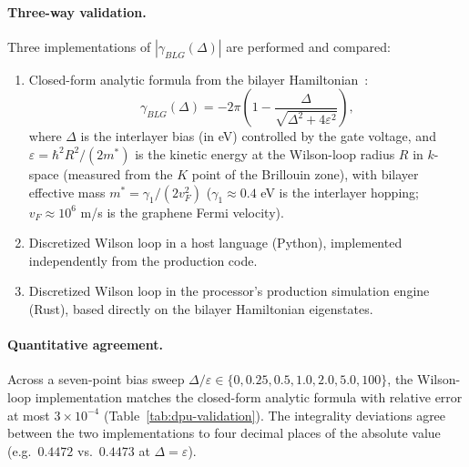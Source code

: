 \documentclass[11pt,letterpaper]{article}
\begin{document}
\paragraph{Three-way validation.}
Three implementations of $|\gamma_{BLG}(\Delta)|$ are
performed and compared:
\begin{enumerate}[nosep]
\item Closed-form analytic formula from the bilayer
  Hamiltonian~\cite{mccann2013bilayer}:
  \[
    \gamma_{BLG}(\Delta)
    = -2\pi \left( 1 - \frac{\Delta}{\sqrt{\Delta^2 + 4\varepsilon^2}} \right),
  \]
  where $\Delta$ is the interlayer bias (in eV) controlled by the
  gate voltage, and
  $\varepsilon = \hbar^2 R^2 / (2 m^*)$ is the kinetic energy at the
  Wilson-loop radius $R$ in $k$-space (measured from the $K$ point of
  the Brillouin zone), with bilayer effective mass
  $m^* = \gamma_1 / (2 v_F^2)$ ($\gamma_1 \approx 0.4$ eV is the
  interlayer hopping; $v_F \approx 10^6$ m/s is the graphene Fermi
  velocity).
\item Discretized Wilson loop in a host language (Python),
  implemented independently from the production code.
\item Discretized Wilson loop in the processor's production
  simulation engine (Rust), based directly on the bilayer
  Hamiltonian eigenstates.
\end{enumerate}

\paragraph{Quantitative agreement.}
Across a seven-point bias sweep $\Delta/\varepsilon \in \{0, 0.25,
0.5, 1.0, 2.0, 5.0, 100\}$, the Wilson-loop implementation matches
the closed-form analytic formula with relative error at most
$3 \times 10^{-4}$ (Table~\ref{tab:dpu-validation}). The
integrality deviations agree between the two implementations to
four decimal places of the absolute value (e.g.\ $0.4472$ vs.\
$0.4473$ at $\Delta = \varepsilon$).
\end{document}
